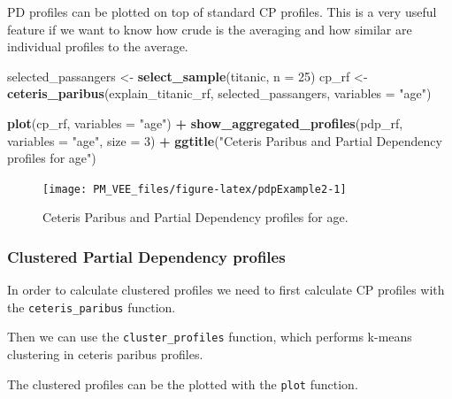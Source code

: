 \documentclass[12pt,]{krantz}
\newenvironment{Shaded}{\begin{snugshade}}{\end{snugshade}}
\newcommand{\DataTypeTok}[1]{\textcolor[rgb]{0.13,0.29,0.53}{#1}}
\newcommand{\DecValTok}[1]{\textcolor[rgb]{0.00,0.00,0.81}{#1}}
\newcommand{\KeywordTok}[1]{\textcolor[rgb]{0.13,0.29,0.53}{\textbf{#1}}}
\newcommand{\NormalTok}[1]{#1}
\newcommand{\OperatorTok}[1]{\textcolor[rgb]{0.81,0.36,0.00}{\textbf{#1}}}
\newcommand{\StringTok}[1]{\textcolor[rgb]{0.31,0.60,0.02}{#1}}
\begin{document}
PD profiles can be plotted on top of standard CP profiles. This is a very useful feature if we want to know how crude is the averaging and how similar are individual profiles to the average.

\begin{Shaded}
\begin{Highlighting}[]
\NormalTok{selected_passangers <-}\StringTok{ }\KeywordTok{select_sample}\NormalTok{(titanic, }\DataTypeTok{n =} \DecValTok{25}\NormalTok{)}
\NormalTok{cp_rf <-}\StringTok{ }\KeywordTok{ceteris_paribus}\NormalTok{(explain_titanic_rf, selected_passangers, }\DataTypeTok{variables =} \StringTok{"age"}\NormalTok{)}

\KeywordTok{plot}\NormalTok{(cp_rf, }\DataTypeTok{variables =} \StringTok{"age"}\NormalTok{) }\OperatorTok{+}
\StringTok{  }\KeywordTok{show_aggregated_profiles}\NormalTok{(pdp_rf, }\DataTypeTok{variables =} \StringTok{"age"}\NormalTok{, }\DataTypeTok{size =} \DecValTok{3}\NormalTok{) }\OperatorTok{+}
\StringTok{  }\KeywordTok{ggtitle}\NormalTok{(}\StringTok{"Ceteris Paribus and Partial Dependency profiles for age"}\NormalTok{) }
\end{Highlighting}
\end{Shaded}

\begin{figure}

{\centering \texttt{[image: PM\_VEE\_files/figure-latex/pdpExample2-1]} 

}

\caption{Ceteris Paribus and Partial Dependency profiles for age.}\label{fig:pdpExample2}
\end{figure}

\hypertarget{clustered-partial-dependency-profiles-2}{%
\subsubsection{Clustered Partial Dependency profiles}\label{clustered-partial-dependency-profiles-2}}

In order to calculate clustered profiles we need to first calculate CP profiles with the \texttt{ceteris\_paribus} function.

Then we can use the \texttt{cluster\_profiles} function, which performs k-means clustering in ceteris paribus profiles.

The clustered profiles can be the plotted with the \texttt{plot} function.
\end{document}
